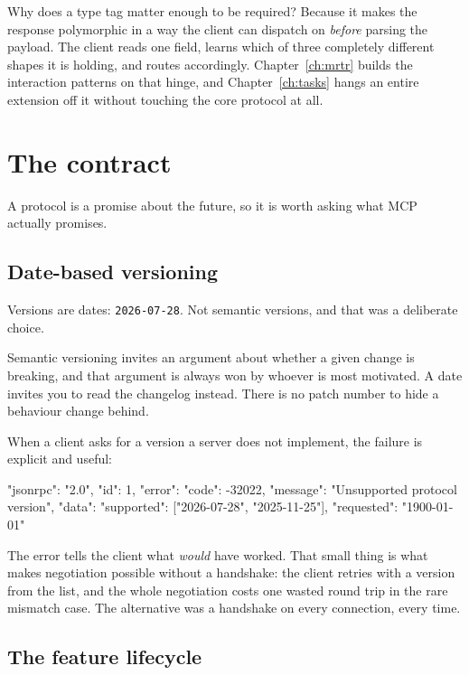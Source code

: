 Why does a type tag matter enough to be required? Because it makes the response
polymorphic in a way the client can dispatch on \emph{before} parsing the
payload. The client reads one field, learns which of three completely different
shapes it is holding, and routes accordingly. Chapter~\ref{ch:mrtr} builds the
interaction patterns on that hinge, and Chapter~\ref{ch:tasks} hangs an entire
extension off it without touching the core protocol at all.

\section{The contract}

A protocol is a promise about the future, so it is worth asking what MCP actually
promises.

\subsection{Date-based versioning}

Versions are dates: \texttt{2026-07-28}. Not semantic versions, and that was a
deliberate choice.

Semantic versioning invites an argument about whether a given change is breaking,
and that argument is always won by whoever is most motivated. A date invites you
to read the changelog instead. There is no patch number to hide a behaviour
change behind.

When a client asks for a version a server does not implement, the failure is
explicit and useful:

\begin{wire}
{
  "jsonrpc": "2.0",
  "id": 1,
  "error": {
    "code": -32022,
    "message": "Unsupported protocol version",
    "data": {
      "supported": ["2026-07-28", "2025-11-25"],
      "requested": "1900-01-01"
    }
  }
}
\end{wire}

The error tells the client what \emph{would} have worked. That small thing is
what makes negotiation possible without a handshake: the client retries with a
version from the list, and the whole negotiation costs one wasted round trip in the rare mismatch case. The
alternative was a handshake on every connection, every time.

\subsection{The feature lifecycle}

